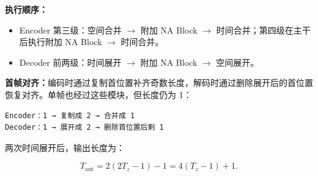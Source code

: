\documentclass[
  11pt,
  a4paper,
  fontset=none]{ctexart}
\providecommand{\tightlist}{%
  \setlength{\itemsep}{0pt}\setlength{\parskip}{0pt}}
\begin{document}
\endgroup

\textbf{执行顺序：}

\begin{itemize}
\tightlist
\item
  Encoder 第三级：空间合并 \(\rightarrow\) 附加 NA Block \(\rightarrow\)
  时间合并；第四级在主干后执行附加 NA Block \(\rightarrow\) 时间合并。
\item
  Decoder 前两级：时间展开 \(\rightarrow\) 附加 NA Block \(\rightarrow\)
  空间展开。
\end{itemize}

\textbf{首帧对齐：}编码时通过复制首位置补齐奇数长度，解码时通过删除展开后的首位置恢复对齐。单帧也经过这些模块，但长度仍为
1：

\begin{verbatim}
Encoder：1 → 复制成 2 → 合并成 1
Decoder：1 → 展开成 2 → 删除首位置后剩 1
\end{verbatim}

两次时间展开后，输出长度为：

\[
T_{\mathrm{out}}=2(2T_z-1)-1=4(T_z-1)+1.
\]
\end{document}
